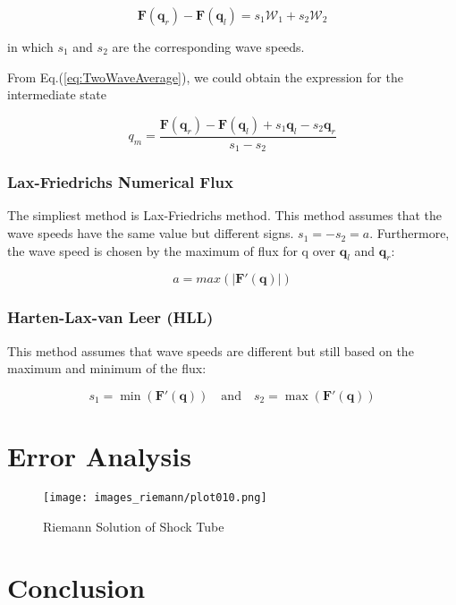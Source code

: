 \documentclass[11pt]{diazessay} %
\begin{document}
\begin{equation}\label{eq:TwoWaveAverage}
    \textbf{F}(\textbf{q}_r) - \textbf{F}(\textbf{q}_l) = s_1\mathcal{W}_1 + s_2\mathcal{W}_2
\end{equation}


in which $s_1$ and $s_2$ are the corresponding wave speeds.

From Eq.(\ref{eq:TwoWaveAverage}), we could obtain the expression for the intermediate state

\begin{equation}
    \label{eq:TwoWaveIntermediate}
    q_m = \frac{\textbf{F}(\textbf{q}_r)-\textbf{F}(\textbf{q}_l) + s_1\textbf{q}_l - s_2\textbf{q}_r}{s_1 - s_2}
\end{equation}




\subsubsection{Lax-Friedrichs Numerical Flux}

The simpliest method is Lax-Friedrichs method. This method assumes that the wave speeds have the same value but different signs. $s_1 = -s_2 = a$. Furthermore, the wave speed is chosen by the maximum of flux for q over $\textbf{q}_l$ and $\textbf{q}_r$:

\begin{equation}
    a =  max(|\textbf{F}'(\textbf{q})|)
\end{equation}

\subsubsection{Harten-Lax-van Leer (HLL)}

This method assumes that wave speeds are different but still based on the maximum and minimum of the flux:

\begin{equation}
    s_1 =  \min(\textbf{F}'(\textbf{q})) \quad \mbox{and}\quad s_2 =  \max(\textbf{F}'(\textbf{q}))
\end{equation}


\section{Error Analysis}

\begin{figure}[h!]
    \centering
    \texttt{[image: images\_riemann/plot010.png]}
    \label{fig:shocktube}
    \caption{Riemann Solution of Shock Tube}
\end{figure}
\section{Conclusion}

\clearpage



\end{document}
